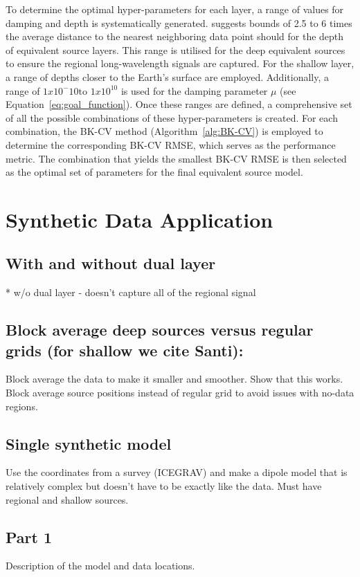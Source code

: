 To determine the optimal hyper-parameters for each layer, a range of values for damping and depth is systematically generated. \citet{Dampney1969} suggests bounds of 2.5 to 6 times the average distance to the nearest neighboring data point should for the depth of equivalent source layers. This range is utilised for the deep equivalent sources to ensure the regional long-wavelength signals are captured. For the shallow layer, a range of depths closer to the Earth's surface are employed. Additionally, a range of $1x10^-10 \text{to } 1x10^10$ is used for the damping parameter $\mu$ (see Equation~\ref{eq:goal_function}). Once these ranges are defined, a comprehensive set of all the possible combinations of these hyper-parameters is created. For each combination, the BK-CV method (Algorithm~\ref{alg:BK-CV}) is employed to determine the corresponding BK-CV RMSE, which serves as the performance metric. The combination that yields the smallest BK-CV RMSE is then selected as the optimal set of parameters for the final equivalent source model.

\section{Synthetic Data Application}

\subsection{With and without dual layer}
* w/o dual layer - doesn't capture all of the regional signal

\subsection{Block average deep sources versus regular grids (for shallow we cite Santi):}
Block average the data to make it smaller and smoother. Show that this works.
Block average source positions instead of regular grid to avoid issues with no-data regions.

\subsection{Single synthetic model}
Use the coordinates from a survey (ICEGRAV) and make a dipole model that is relatively complex but doesn't have to be exactly like the data. Must have regional and shallow sources.


\subsection{Part 1}
Description of the model and data locations.

